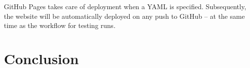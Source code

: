 GitHub Pages takes care of deployment when a YAML is specified. Subsequently, the website will be automatically deployed on any push to GitHub -- at the same time as the workflow for testing runs.

\chapter{Conclusion}

\cleardoublepage
{}
{}
\printbibliography
